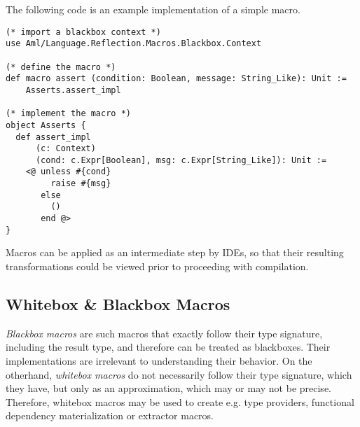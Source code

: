 \example The following code is an example implementation of a simple  macro. 
\begin{lstlisting}[deletekeywords={message,assert}]
(* import a blackbox context *)
use Aml/Language.Reflection.Macros.Blackbox.Context

(* define the macro *)
def macro assert (condition: Boolean, message: String_Like): Unit := 
    Asserts.assert_impl

(* implement the macro *)
object Asserts {
  def assert_impl 
      (c: Context)
      (cond: c.Expr[Boolean], msg: c.Expr[String_Like]): Unit :=
    <@ unless #{cond}
         raise #{msg}
       else
         ()
       end @>
}
\end{lstlisting}

Macros can be applied as an intermediate step by IDEs, so that their resulting transformations could be viewed prior to proceeding with compilation. 





\subsection{Whitebox \& Blackbox Macros}
\label{sec:whitebox-blackbox-macros}

{\em Blackbox macros} are such macros that exactly follow their type signature, including the result type, and therefore can be treated as blackboxes. Their implementations are irrelevant to understanding their behavior. On the otherhand, {\em whitebox macros} do not necessarily follow their type signature, which they have, but only as an approximation, which may or may not be precise. Therefore, whitebox macros may be used to create e.g. type providers, functional dependency materialization or extractor macros. 


